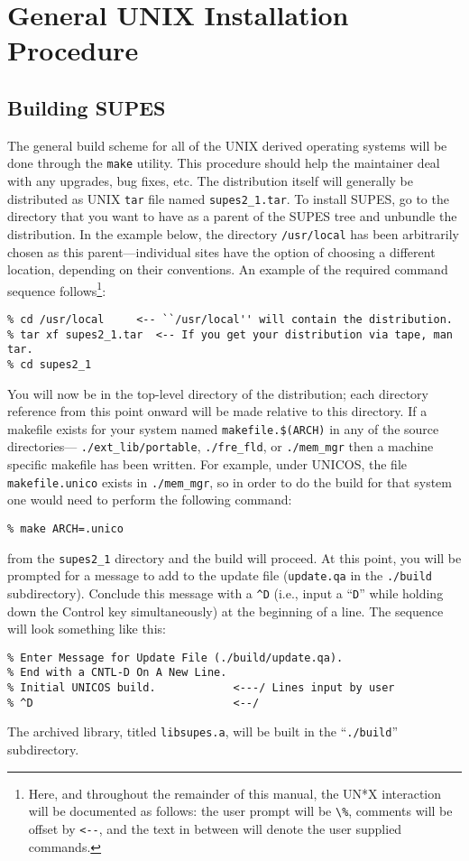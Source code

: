 \section{General UNIX Installation Procedure}

\subsection{Building SUPES}
The general build scheme for all of the UNIX
derived operating systems will be done through the
\verb+make+ utility.
This procedure should help the maintainer deal with any
upgrades, bug fixes, etc.
The distribution itself will generally be distributed
as UNIX \verb+tar+
file named
\verb+supes2_1.tar+.
To install SUPES,
go to the directory that you want to have as a
parent of the SUPES tree and unbundle the distribution.
In the example below,
the directory
\verb+/usr/local+
has been arbitrarily chosen as this parent---individual
sites have the option of choosing a different location,
depending on their conventions.
An example of the required
command sequence follows\footnote{Here, and throughout the
remainder of this manual,
the UN*X interaction will be documented as follows:
the user prompt will be \verb+\%+,
comments will be offset by \verb+<--+, and
the text in between will denote the user supplied commands.}:
\begin{verbatim}
% cd /usr/local     <-- ``/usr/local'' will contain the distribution.
% tar xf supes2_1.tar  <-- If you get your distribution via tape, man tar.
% cd supes2_1
\end{verbatim}
You will now be in the top-level directory of the distribution;
each directory reference from this point onward will be made
relative to this directory.
If a makefile exists for your system named
\verb+makefile.$(ARCH)+
in any of the source directories---%
\verb+./ext_lib/portable+,
\verb+./fre_fld+,
or
\verb+./mem_mgr+
then a machine specific makefile
has been written.
For example, under UNICOS,
the file
\verb+makefile.unico+
exists in
\verb+./mem_mgr+,
so in order to do the build for that system one would need
to perform the following command:
\begin{verbatim}
% make ARCH=.unico
\end{verbatim}
from the \verb+supes2_1+ directory
and the build will proceed.
At this point, you will be prompted for a message to add to the
update file (\verb+update.qa+ in the \verb+./build+ subdirectory).
Conclude
this message with a \verb+^D+ (i.e., input a ``\verb+D+'' while holding
down the Control key simultaneously) at the beginning of a line.
The sequence will look something like this:
\begin{verbatim}
% Enter Message for Update File (./build/update.qa).
% End with a CNTL-D On A New Line.
% Initial UNICOS build.            <---/ Lines input by user
% ^D                               <--/
\end{verbatim}
The archived library, titled
\verb+libsupes.a+,
will be built in
the ``\verb+./build+'' subdirectory.


